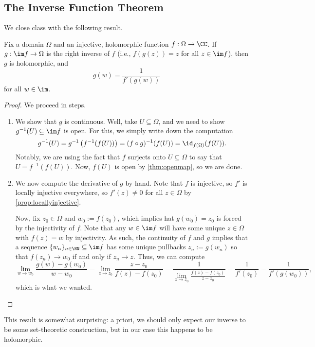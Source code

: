 \subsection{The Inverse Function Theorem}
We close class with the following result.
\begin{theorem} \label{thm:inv}
	Fix a domain $\Omega$ and an injective, holomorphic function $f:\Omega\to\CC$. If $g:\im f\to\Omega$ is the right inverse of $f$ (i.e., $f(g(z))=z$ for all $z\in\im f$), then $g$ is holomorphic, and
	\[g(w)=\frac1{f'(g(w))}\]
	for all $w\in\im $.
\end{theorem}
\begin{proof}
	We proceed in steps.
	\begin{enumerate}
		\item We show that $g$ is continuous. Well, take $U\subseteq\Omega$, and we need to show $g^{-1}(U)\subseteq\im f$ is open. For this, we simply write down the computation
		\[g^{-1}(U)=g^{-1}\left(f^{-1}(f(U))\right)=(f\circ g)^{-1}(f(U))=\id_{f(\Omega)}(f(U)).\]
		Notably, we are using the fact that $f$ surjects onto $U\subseteq\Omega$ to say that $U=f^{-1}(f(U))$. Now, $f(U)$ is open by \autoref{thm:openmap}, so we are done.
		\item We now compute the derivative of $g$ by hand. Note that $f$ is injective, so $f'$ is locally injective everywhere, so $f'(z)\ne0$ for all $z\in\Omega$ by \autoref{prop:locallyinjective}.
		
		Now, fix $z_0\in\Omega$ and $w_0:=f(z_0)$, which implies hat $g(w_0)=z_0$ is forced by the injectivity of $f$. Note that any $w\in\im f$ will have some unique $z\in\Omega$ with $f(z)=w$ by injectivity. As such, the continuity of $f$ and $g$ implies that a sequence $\{w_n\}_{n\in\NN}\subseteq\im f$ has some unique pullbacks $z_n:=g(w_n)$ so that $f(z_n)\to w_0$ if and only if $z_n\to z$. Thus, we can compute
		\[\lim_{w\to w_0}\frac{g(w)-g(w_0)}{w-w_0}=\lim_{z\to z_0}\frac{z-z_0}{f(z)-f(z_0)}=\frac1{\lim_{z\to z_0}\frac{f(z)-f(z_0)}{z-z_0}}=\frac1{f'(z_0)}=\frac1{f'(g(w_0))},\]
		which is what we wanted.
		\qedhere
	\end{enumerate}
\end{proof}
\begin{remark}
	This result is somewhat surprising: a priori, we should only expect our inverse to be some set-theoretic construction, but in our case this happens to be holomorphic.
\end{remark}
